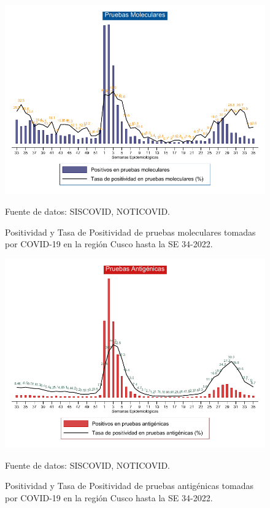 \documentclass[12pt,a4paper,openany]{book}
\begin{document}
	
	\begin{landscape}
		\begin{figure}[h]
			\caption{Positividad y Tasa de Positividad de pruebas moleculares tomadas por COVID-19 en la región Cusco hasta la SE 34-2022.}\label{fig:positividad_pcr}
			\begin{center}
				\includegraphics[width=0.90\linewidth]{../figuras/positividad_pcr.pdf}
			\end{center}
			{\footnotesize {Fuente de datos: SISCOVID, NOTICOVID.}}
		\end{figure}
	\end{landscape}
	\clearpage
	\begin{landscape}
		
		\begin{figure}[h]
			\caption{ Positividad y Tasa de Positividad de pruebas antigénicas tomadas por COVID-19 en la región Cusco hasta la SE 34-2022.}\label{fig:positividad_ag}
			\begin{center}
				\includegraphics[width=0.90\linewidth]{../figuras/positividad_ag.pdf}
			\end{center}
			{\footnotesize {Fuente de datos: SISCOVID, NOTICOVID.}}
		\end{figure}
	\end{landscape}
\end{document}
